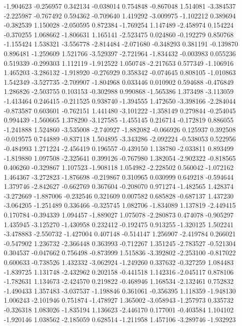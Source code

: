 -1.904623
-0.256957
0.342134
-0.038014
0.754848
-0.867048
1.514081
-3.384537
-2.225987
-0.767492
0.594362
-0.709640
1.419292
-3.009975
-1.102212
0.389694
-0.382539
1.150028
-2.050595
0.872384
-1.769254
1.147489
-2.458974
0.154224
-0.370255
1.068662
-1.806631
1.165141
-2.523475
0.024860
-0.192279
0.850768
-1.155424
1.538321
-3.556778
-2.814484
-2.071680
-0.348293
0.381191
-0.139870
0.896481
-1.259609
1.521766
-3.529397
-2.721964
-1.834432
-0.003983
0.055236
0.519339
-0.299303
1.112119
-1.912522
1.050748
-2.217653
0.577349
-1.106916
1.465203
-3.286132
-1.918920
-0.276929
0.358342
-0.074645
0.808105
-1.010863
1.542349
-3.527735
-2.709907
-1.804968
0.033446
0.010902
0.594688
-0.476849
1.286826
-2.503755
0.103153
-0.302988
0.990868
-1.565386
1.373498
-3.113059
-1.413464
0.246415
-0.211525
0.938740
-1.394555
1.472650
-3.398166
-2.284044
-0.873587
0.603601
-0.762151
1.441480
-3.101222
-1.358149
0.279844
-0.254045
0.994439
-1.560665
1.378290
-3.127585
-1.455145
0.216714
-0.172819
0.886055
-1.241888
1.524860
-3.535008
-2.740927
-1.882082
-0.066926
0.125937
0.392508
-0.019575
0.744889
-0.837118
1.504895
-3.343286
-2.092224
-0.538053
0.522956
-0.484993
1.271224
-2.456419
0.196557
-0.439150
1.138780
-2.033811
0.893499
-1.819880
1.097508
-2.325641
0.399126
-0.767980
1.382054
-2.902322
-0.818565
0.406260
-0.329867
1.107523
-1.908118
1.054982
-2.228502
0.560042
-1.072162
1.464367
-3.272823
-1.876698
-0.219867
0.310965
0.030999
0.649218
-0.594644
1.379746
-2.842627
-0.662769
0.367604
-0.208070
0.971274
-1.482565
1.428374
-3.272669
-1.887006
-0.232546
0.321609
0.007582
0.685828
-0.687137
1.437230
-3.064205
-1.251489
0.336466
-0.325745
1.082706
-1.834089
1.137819
-2.449415
0.170784
-0.394339
1.094457
-1.889027
1.075078
-2.280873
0.474078
-0.905297
1.435945
-3.125270
-1.430958
0.232412
-0.192475
0.913255
-1.320125
1.502241
-3.478883
-2.550732
-1.427004
0.407148
-0.514147
1.256907
-2.419784
0.266021
-0.547902
1.236732
-2.366448
0.363993
-0.712267
1.351245
-2.783527
-0.521304
0.304537
-0.047662
0.756498
-0.873999
1.515836
-3.392802
-2.253100
-0.817022
0.600633
-0.738526
1.432332
-3.062924
-1.249260
0.337632
-0.327259
1.084483
-1.839725
1.131748
-2.432962
0.202158
-0.441518
1.142316
-2.045117
0.878106
-1.782631
1.134673
-2.424570
0.219822
-0.468946
1.168534
-2.132461
0.752832
-1.490433
1.357483
-3.037537
-1.198846
0.361061
-0.356395
1.118359
-1.948130
1.006243
-2.101946
0.751874
-1.478927
1.365002
-3.058943
-1.257973
0.335732
-0.326318
1.083026
-1.835194
1.136623
-2.446170
0.177001
-0.403584
1.104102
-1.920146
1.038562
-2.185059
0.628514
-1.211958
1.457106
-3.289746
-1.932923
